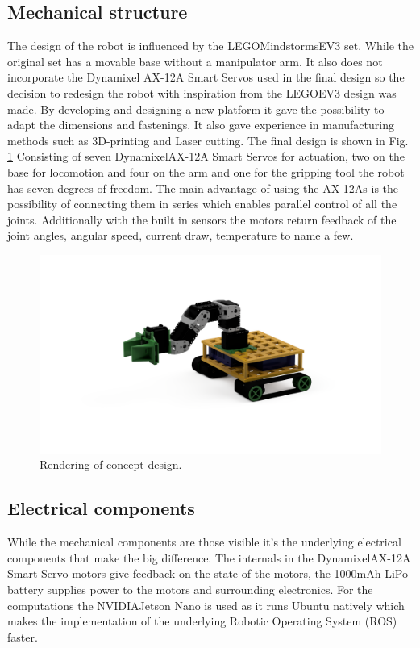 
\subsection{Mechanical structure}
The design of the robot is influenced by the LEGO\textregistered Mindstorms\textregistered EV3 set. While the original set has a movable base without a manipulator arm. It also does not incorporate the Dynamixel AX-12A Smart Servos used in the final design so the decision to redesign the robot with inspiration from the LEGO\textregistered EV3 design was made. By developing and designing a new platform it gave the possibility to adapt the dimensions and fastenings. It also gave experience in manufacturing methods such as 3D-printing and Laser cutting. The final design is shown in Fig. \ref{fig:concept_rendering}
Consisting of seven Dynamixel\textregistered AX-12A Smart Servos for actuation, two on the base for locomotion and four on the arm and one for the gripping tool the robot has seven degrees of freedom. The main advantage of using the AX-12As is the possibility of connecting them in series which enables parallel control of all the joints. Additionally with the built in sensors the motors return feedback of the joint angles, angular speed, current draw, temperature to name a few.  

\begin{figure}
    \centering
    \includegraphics[width=0.7\columnwidth]{chapters/img/rendering.png}
    \caption{Rendering of concept design.}
    \label{fig:concept_rendering}
\end{figure}

\subsection{Electrical components}
While the mechanical components are those visible it's the underlying electrical components that make the big difference. The internals in the Dynamixel\textregistered AX-12A Smart Servo motors give feedback on the state of the motors, the 1000mAh LiPo battery supplies power to the motors and surrounding electronics. For the computations the NVIDIA\textregistered Jetson Nano is used as it runs Ubuntu natively which makes the implementation of the underlying Robotic Operating System (ROS) \cite{ros} faster. 


